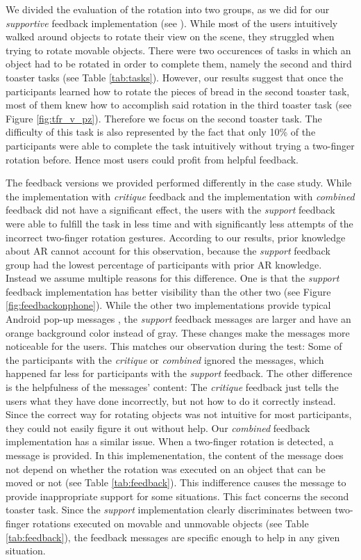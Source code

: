 \documentclass[11pt, a4paper]{article}
\begin{document}
			We divided the evaluation of the rotation into two groups, as we did for our \emph{supportive} feedback implementation (see ). While most of the users intuitively walked around objects to rotate their view on the scene, they struggled when trying to rotate movable objects. There were two occurences of tasks in which an object had to be rotated in order to complete them, namely the second and third toaster tasks (see Table \ref{tab:tasks}). However, our results suggest that once the participants learned how to rotate the pieces of bread in the second toaster task, most of them knew how to accomplish said rotation in the third toaster task (see Figure \ref{fig:tfr_v_pz}). Therefore we focus on the second toaster task. The difficulty of this task is also represented by the fact that only 10\% of the participants were able to complete the task intuitively without trying a two-finger rotation before. Hence most users could profit from helpful feedback.

			The feedback versions we provided performed differently in the case study. While the implementation with \emph{critique} feedback and the implementation with \emph{combined} feedback did not have a significant effect, the users with the \emph{support} feedback were able to fulfill the task in less time and with significantly less attempts of the incorrect two-finger rotation gestures. According to our results, prior knowledge about \ac{AR} cannot account for this observation, because the \emph{support} feedback group had the lowest percentage of participants with prior \ac{AR} knowledge. Instead we assume multiple reasons for this difference. One is that the \emph{support} feedback implementation has better visibility than the other two (see Figure \ref{fig:feedbackonphone}). While the other two implementations provide typical Android pop-up messages \cite{Toast2020}, the \emph{support} feedback messages are larger and have an orange background color instead of gray. These changes make the messages more noticeable for the users. This matches our observation during the test: Some of the participants with the \emph{critique} or \emph{combined} ignored the messages, which happened far less for participants with the \emph{support} feedback. The other difference is the helpfulness of the messages' content: The \emph{critique} feedback just tells the users what they have done incorrectly, but not how to do it correctly instead. Since the correct way for rotating objects was not intuitive for most participants, they could not easily figure it out without help. Our \emph{combined} feedback implementation has a similar issue. When a two-finger rotation is detected, a message is provided. In this implemenentation, the content of the message does not depend on whether the rotation was executed on an object that can be moved or not (see Table \ref{tab:feedback}). This indifference causes the message to provide inappropriate support for some situations. This fact concerns the second toaster task. Since the \emph{support} implementation clearly discriminates between two-finger rotations executed on movable and unmovable objects (see Table \ref{tab:feedback}), the feedback messages are specific enough to help in any given situation.
\end{document}
